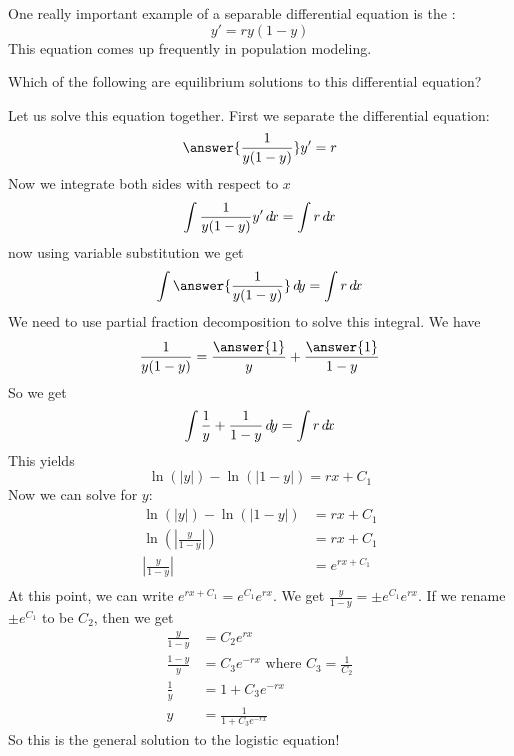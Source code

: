 \documentclass{ximera}
\begin{document}
\begin{example}	
One really important example of a separable differential equation is
the :
\[
y' = ry(1-y)
\]
This equation comes up frequently in population modeling.  

\begin{question}
  Which of the following are equilibrium solutions to this differential equation?
  \begin{multipleChoice}
  \end{multipleChoice}
\end{question}
Let us solve this equation together.  First we separate the differential equation:
\[
\answer{\frac{1}{y(1-y)}} y'  = r
\]
Now we integrate both sides with respect to $x$
\[
\int \frac{1}{y(1-y)} y' \mathop{}\!d\! x =\int r \mathop{}\!d\! x
\]
now using variable substitution we get
\[
\int \answer{\frac{1}{y(1-y)}} \d y = \int r \d x
\]
We need to use partial fraction decomposition to solve this integral.
We have
\[
\frac{1}{y(1-y)} = \frac{\answer{1}}{y}+\frac{\answer{1}}{1-y}
\]
So we get
\[
\int \frac{1}{y} + \frac{1}{1-y} \mathop{}\!d\! y = \int r \mathop{}\!d\! x
\]
This yields
\[
\ln(|y|) -  \ln(|1-y|)  = rx+C_1
\]
Now we can solve for $y$:
\begin{align*}
\ln(|y|) -  \ln(|1-y|)  &= rx+C_1\\
\ln(|\frac{y}{1-y}|) &= rx+C_1\\
|\frac{y}{1-y}| &= e^{rx+C_1}\\
\end{align*}
At this point, we can write $e^{rx+C_1} = e^{C_1} e^{rx}$.  We get $\frac{y}{1-y} = \pm e^{C_1} e^{rx}$.  If we rename $\pm e^{C_1}$ to be $C_2$, then we get
\begin{align*}
  \frac{y}{1-y} &=  C_2e^{rx}\\
  \frac{1-y}{y} &= C_3e^{-rx} \textrm{ where $C_3  =\frac{1}{C_2}$}\\
  \frac{1}{y} &= 1+C_3e^{-rx}\\
  y &= \frac{1}{1+C_3e^{-rx}}
\end{align*}
So this is the general solution to the logistic equation!
\end{example}
\end{document}
